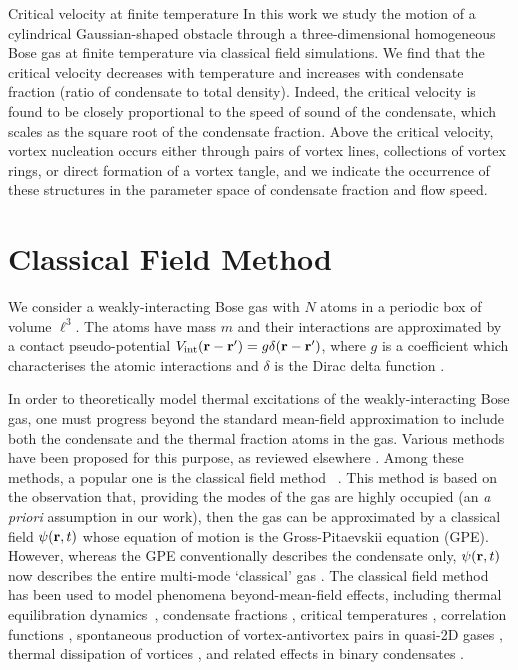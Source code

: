 \begin{chapter}{\label{cha:nonequib}Critical velocity at finite temperature}
In this work we study the motion of a cylindrical Gaussian-shaped
obstacle through a three-dimensional homogeneous Bose gas at finite
temperature via classical field simulations. We
find that the critical velocity decreases with temperature and
increases with condensate fraction (ratio of condensate to total density).
Indeed, the critical velocity is found to be closely proportional
to the speed of sound of the condensate, which scales as the square
root of the condensate fraction. Above
the critical velocity, vortex nucleation occurs either through
pairs of vortex lines, collections of vortex rings, or direct formation of a vortex tangle, and we indicate the occurrence of these structures in the parameter space of condensate fraction and flow speed.

  \section{Classical Field Method}
\label{sec:theory}

We consider a weakly-interacting Bose gas with $N$ atoms in a periodic box of volume $\ell^3$.  The atoms have mass $m$ and their interactions are approximated by a contact pseudo-potential $V_{\mathrm{int}}({\bf r}-{\bf r'})= g \delta({\bf r}-{\bf r'})$, where $g$ is a coefficient which characterises the atomic interactions and $\delta$ is the Dirac delta function \cite{Pethick}.

In order to theoretically model thermal excitations of the weakly-interacting
Bose gas, one must progress beyond the standard mean-field approximation to
include both the condensate and the thermal fraction atoms in the gas.
Various methods have been proposed
for this purpose, as reviewed elsewhere
\cite{Pol_Rev,Proukakis,griffin2009bose,finite_temp_book,Blakie,berloff_2014}.
Among these methods, a popular one
is the classical field method ~\cite{Svis5,Davis,PRL.87.210404,
PhysRevA.66.013603,Davis2,PhysRevLett.95.263901,Pol_Rev}.
This method is based on the observation that, providing the modes of
the gas are highly occupied (an {\it a priori} assumption in our work), then the gas can be
approximated by a classical field $\psi({\bf r},t)$
whose equation of motion is the Gross-Pitaevskii equation (GPE).
However, whereas the GPE
conventionally describes the condensate only, $\psi({\bf r},t)$
now describes the entire multi-mode `classical' gas \cite{Proukakis,Blakie}.  The classical field method has been used to model phenomena
beyond-mean-field effects, including thermal equilibration dynamics~\cite{PhysRevA.66.013603,PhysRevLett.95.263901,pattinson_2014,nazarenko_2014}, condensate fractions \cite{Davis}, critical temperatures \cite{Davis2006}, correlation functions \cite{Wright2011}, spontaneous production of vortex-antivortex pairs in quasi-2D gases \cite{Simula}, thermal dissipation of vortices \cite{berloff_2007},  and related effects in binary condensates \cite{Berloff_2006,Salman20091482,pattinson_2014}.



\end{chapter}
